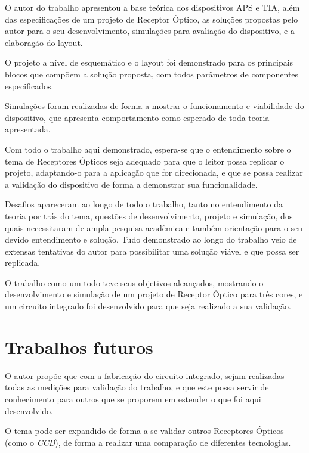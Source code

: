 
O autor do trabalho apresentou a base teórica dos dispositivos APS e TIA, além das especificações de um projeto de Receptor Óptico, as soluções propostas pelo autor para o seu desenvolvimento, simulações para avaliação do dispositivo, e a elaboração do layout.

O projeto a nível de esquemático e o layout foi demonstrado para os principais blocos que compõem a solução proposta, com todos parâmetros de componentes especificados.

Simulações foram realizadas de forma a mostrar o funcionamento e viabilidade do dispositivo, que apresenta comportamento como esperado de toda teoria apresentada.

Com todo o trabalho aqui demonstrado, espera-se que o entendimento sobre o tema de Receptores Ópticos seja adequado para que o leitor possa replicar o projeto, adaptando-o para a aplicação que for direcionada, e que se possa realizar a validação do dispositivo de forma a demonstrar sua funcionalidade.

Desafios apareceram ao longo de todo o trabalho, tanto no entendimento da teoria por trás do tema, questões de desenvolvimento, projeto e simulação, dos quais necessitaram de ampla pesquisa acadêmica e também orientação para o seu devido entendimento e solução. Tudo demonstrado ao longo do trabalho veio de extensas tentativas do autor para possibilitar uma solução viável e que possa ser replicada. 

O trabalho como um todo teve seus objetivos alcançados, mostrando o desenvolvimento e simulação de um projeto de Receptor Óptico para três cores, e um circuito integrado foi desenvolvido para que seja realizado a sua validação.

\section{Trabalhos futuros}

O autor propõe que com a fabricação do circuito integrado, sejam realizadas todas as medições para validação do trabalho, e que este possa servir de conhecimento para outros que se proporem em estender o que foi aqui desenvolvido.

O tema pode ser expandido de forma a se validar outros Receptores Ópticos (como o \textit{CCD}), de forma a realizar uma comparação de diferentes tecnologias.